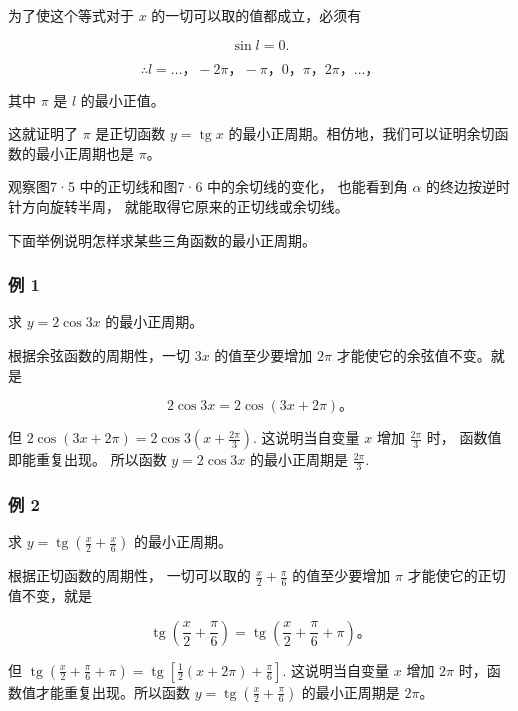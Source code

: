 为了使这个等式对于 \(x\) 的一切可以取的值都成立，必须有

\[
\sin l = 0.
\]

\[
\therefore l = \dots \text{，} - 2 \pi \text{，} - \pi \text{，} 0\text{，} \pi \text{，} 2 \pi \text{，} \dots \text{，}
\]

其中 \(\pi\) 是 \(l\) 的最小正值。

这就证明了 \(\pi\) 是正切函数 \(y = \operatorname{tg} x\)
的最小正周期。相仿地，我们可以证明余切函数的最小正周期也是 \(\pi\)。

观察图7·5 中的正切线和图7·6 中的余切线的变化， 也能看到角 \(\alpha\)
的终边按逆时针方向旋转半周， 就能取得它原来的正切线或余切线。

下面举例说明怎样求某些三角函数的最小正周期。

\subsubsection{例 1}

求 \(y=2\cos3x\) 的最小正周期。

 根据余弦函数的周期性，一切 \(3x\) 的值至少要增加
\(2\pi\) 才能使它的余弦值不变。就是

\[
2 \cos 3 x = 2 \cos (3 x + 2 \pi)\text{。}
\]

但 \(2\cos (3x + 2\pi) = 2\cos 3\left(x + \frac{2\pi}{3}\right)\).
这说明当自变量 \(x\) 增加 \(\frac{2\pi}{3}\) 时， 函数值即能重复出现。
所以函数 \(y = 2\cos 3x\) 的最小正周期是 \(\frac{2\pi}{3}\).

\subsubsection{例 2}

求 \(y = \operatorname{tg}\left(\frac{x}{2} + \frac{x}{6}\right)\)
的最小正周期。

 根据正切函数的周期性， 一切可以取的
\(\frac{x}{2} + \frac{\pi}{6}\) 的值至少要增加 \(\pi\)
才能使它的正切值不变，就是

\[
\operatorname{tg} \left(\frac {x}{2} + \frac {\pi}{6}\right) = \operatorname{tg} \left(\frac {x}{2} + \frac {\pi}{6} + \pi\right)\text{。}
\]

但
\(\operatorname{tg}\left(\frac{x}{2} + \frac{\pi}{6} + \pi\right) = \operatorname{tg}\left[\frac{1}{2}(x + 2\pi) + \frac{\pi}{6}\right]\).
这说明当自变量 \(x\) 增加 \(2\pi\) 时，函数值才能重复出现。所以函数
\(y = \operatorname{tg}\left(\frac{x}{2} + \frac{\pi}{6}\right)\)
的最小正周期是 \(2\pi\)。

